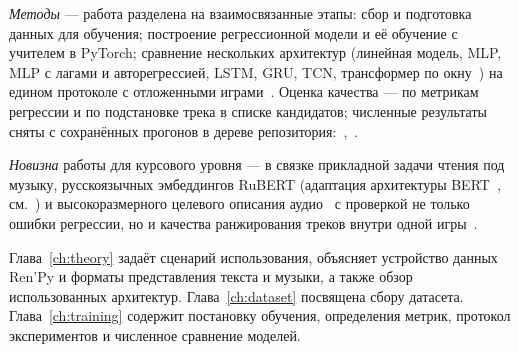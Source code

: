 \textit{Методы} --- работа разделена на взаимосвязанные этапы: сбор и подготовка данных для обучения; построение регрессионной модели и её обучение с учителем в PyTorch; сравнение нескольких архитектур (линейная модель, MLP, MLP с лагами и авторегрессией, LSTM, GRU, TCN, трансформер по окну~\cite{vaswani2017}) на едином протоколе с отложенными играми~\cite{nikolenko2018}. Оценка качества --- по метрикам регрессии и по подстановке трека в списке кандидатов; численные результаты сняты с сохранённых прогонов в дереве  репозитория:~,~.

\textit{Новизна} работы для курсового уровня --- в связке прикладной задачи чтения под музыку, русскоязычных эмбеддингов RuBERT (адаптация архитектуры BERT~\cite{devlin2018}, см.~\cite{kuratov2019}) и высокоразмерного целевого описания аудио~\cite{librosa} с проверкой не только ошибки регрессии, но и качества ранжирования треков внутри одной игры~\cite{nikolenko2018}.

Глава~\ref{ch:theory} задаёт сценарий использования, объясняет устройство данных Ren'Py и форматы представления текста и музыки, а также обзор использованных архитектур. Глава~\ref{ch:dataset} посвящена сбору датасета. Глава~\ref{ch:training} содержит постановку обучения, определения метрик, протокол экспериментов и численное сравнение моделей.
